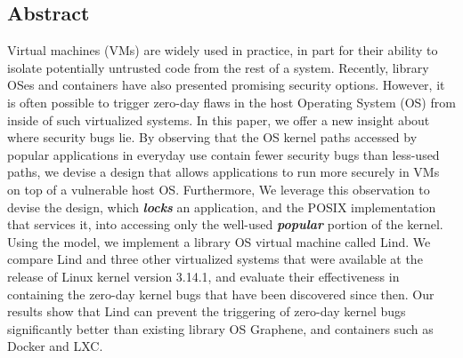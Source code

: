 \subsection*{Abstract}

Virtual machines (VMs) are widely used in practice, in part for their ability to
isolate potentially untrusted code from the rest of a system.
Recently, library OSes and containers have also presented promising security options.
%
However, it is often possible to trigger zero-day flaws
in the host Operating System (OS) from inside of such virtualized systems.
%
In this paper, we offer a new insight about where security bugs lie. By observing that the OS kernel paths accessed
by popular applications in everyday use contain fewer security bugs than less-used paths, we devise a design that allows applications to run more securely in VMs on top of a vulnerable host OS.
Furthermore, We
leverage this observation to devise the \lip design, which
\textbf{\textit{locks}} an application, and the POSIX implementation that services it, into
accessing only the well-used \textbf{\textit{popular}} portion of the kernel.  Using the \lip model, we
implement a library OS virtual machine called Lind.
%
We compare Lind and three other virtualized systems that were
available at the release of Linux kernel version 3.14.1, and evaluate
their effectiveness in containing the zero-day kernel bugs that have been discovered
since then.
%
Our results show that Lind can prevent the triggering of zero-day kernel bugs significantly better
than existing library OS Graphene, and containers such as Docker and LXC.
